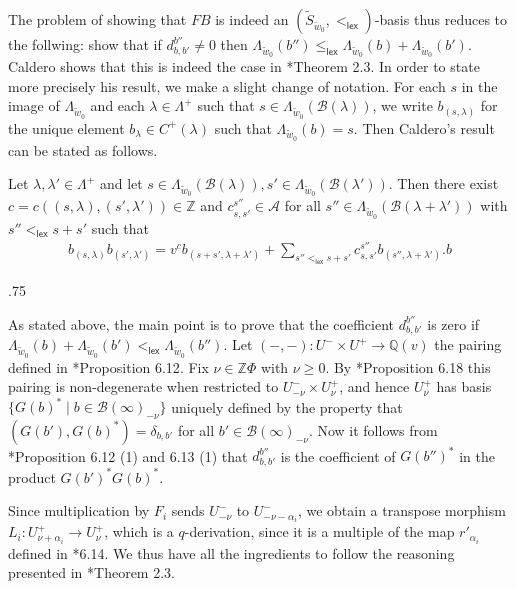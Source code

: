 \documentclass[11pt,fleqn]{article}
\makeatletter
\renewenvironment{proof}[1][\textit{Proof}]{\par
  \pushQED{\qed}%
  \normalfont \topsep.75\paraskip\relax
  \trivlist
  \item[\hskip\labelsep
        \itshape
    #1\@addpunct{.}]\ignorespaces
}{%
  \popQED\endtrivlist\@endpefalse
}
\newcommand\QQ{\mathbb Q}
\newcommand\ZZ{\mathbb Z}
\renewcommand\to{\longrightarrow}
\newcommand\A{\mathcal A}
\newcommand\B{\mathcal B}
\newcommand\lex{\mathsf{lex}}
\newcommand\flagbasis{FB}
\makeatother
\begin{document}
The problem of showing that $\flagbasis$ is indeed an $(\tilde S_{\tilde w_0}, 
<_{\lex})$-basis thus reduces to the follwing: show that if $d_{b,b'}^{b''} 
\neq 0$ then $\Lambda_{\tilde w_0}(b'') \leq_{\lex} \Lambda_{\tilde w_0}(b) + 
\Lambda_{\tilde w_0}(b')$. Caldero shows that this is indeed the case in 
\cite{C}*{Theorem 2.3}. In order to state more precisely his result, we make a 
slight change of notation. For each $s$ in the image of $\Lambda_{\tilde w_0}$ 
and each $\lambda \in \Lambda^+$ such that $s \in \Lambda_{\tilde w_0}(
\B(\lambda))$, we write $b_{(s,\lambda)}$ for the unique element $b_\lambda 
\in C^+(\lambda)$ such that $\Lambda_{\tilde w_0}(b) = s$. Then Caldero's 
result can be stated as follows.

\begin{Proposition*}
Let $\lambda, \lambda' \in \Lambda^+$ and let $s \in \Lambda_{\tilde w_0}
(\B(\lambda)), s' \in \Lambda_{\tilde w_0}(\B(\lambda'))$. Then there exist 
$c = c((s,\lambda),(s',\lambda')) \in \ZZ$ and $c_{s, s'}^{s''} \in \A$ 
for all $s'' \in \Lambda_{\tilde w_0}(\B(\lambda + \lambda'))$ with $s'' 
<_{\lex} s+ s'$ such that 
\begin{align*}
\label{product-formula} 
b_{(s, \lambda)} b_{(s', \lambda')}
  = v^c b_{(s+s', \lambda + \lambda')} 
    + \sum_{s'' <_{\lex} s+s'} c_{s,s'}^{s''} b_{(s'', \lambda + \lambda')}.b
\end{align*} 
\end{Proposition*} 
\begin{proof}[Sketch of the proof]
As stated above, the main point is to prove that
the coefficient $d_{b,b'}^{b''}$ is zero if $\Lambda_{\tilde w_0}(b) + 
\Lambda_{\tilde w_0}(b') <_{\lex} \Lambda_{\tilde w_0}(b'')$. Let $(-,-): U^- 
\times U^+ \to \QQ(v)$ the pairing defined in \cite{Jan}*{Proposition 6.12}. 
Fix $\nu \in \ZZ\Phi$ with $\nu \geq 0$. By \cite{Jan}*{Proposition 6.18} this 
pairing is non-degenerate when restricted to $U^-_{-\nu} \times U^+_{\nu}$, 
and hence $U^+_{\nu}$ has basis $\{G(b)^* \mid b \in \B(\infty)_{-\nu}\}$ 
uniquely defined by the property that $(G(b'),G(b)^*) = \delta_{b,b'}$ for all
$b' \in \B(\infty)_{-\nu}$. Now it follows from \cite{Jan}*{Proposition 6.12 
(1) and 6.13 (1)} that $d_{b,b'}^{b''}$ is the coefficient of $G(b'')^*$
in the product $G(b')^*G(b)^*$. 

Since multiplication by $F_i$ sends $U^-_{-\nu}$ to $U^-_{-\nu - \alpha_i}$, 
we obtain a transpose morphism $L_i: U^+_{\nu + \alpha_i} \to U^+_{\nu}$, which
is a $q$-derivation, since it is a multiple of the map $r'_{\alpha_i}$ defined 
in \cite{Jan}*{6.14}. We thus have all the ingredients to follow the reasoning 
presented in \cite{C}*{Theorem 2.3}.
\end{proof}
\end{document}
